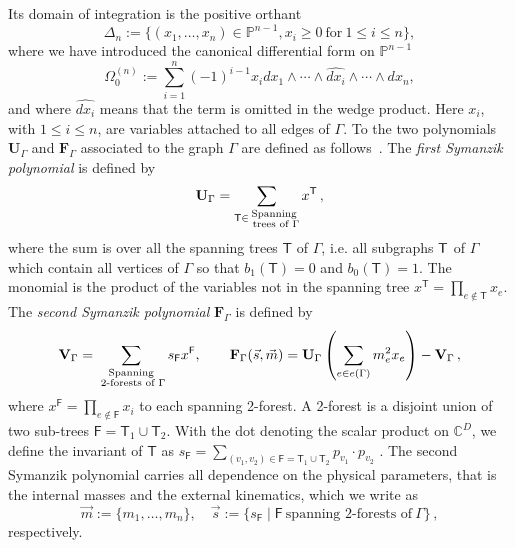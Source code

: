 \documentclass[a4paper,12pt]{article}
\newcommand\lNote[1]{
	\todo[backgroundcolor=red!20!white,fancyline,
	bordercolor=white]{ LDLC:  #1}}
\numberwithin{equation}{section}
\numberwithin{figure}{section}
\begin{document}
Its domain of integration is the positive orthant\lNote{new paragraph?}
\begin{equation}\label{e:Deltan}
	\Delta_n:=\{(x_1,\dots,x_n)\in \mathbb P^{n-1}, x_i \geq0 ~\textrm{for}~ 1\leq
	i\leq n\},
\end{equation}
where we have introduced the  canonical differential form on
$\mathbb P^{n-1}$ 
% 
\begin{equation}
	\Omega_0^{(n)}:=  \sum_{i=1}^n (-1)^{i-1} x_i dx_1\wedge \cdots \wedge \widehat{dx_i} \wedge\cdots \wedge dx_n ,
\end{equation}
and where  $\widehat{dx_i}$ means that the term is omitted in the wedge
product.
Here  $x_i$, with $1\leq i\leq n$,  are  variables attached to all edges of
$\Gamma$.
%
To the two polynomials $\textbf{U}_\Gamma$ and $\textbf{F}_\Gamma$
associated to the graph $\Gamma$ are defined as
follows~\cite{nakanishi1971graph,Bogner:2010kv,Weinzierl:2022eaz}.  The {\em first
Symanzik polynomial} is defined by
\begin{equation}\label{e:Udef}
{\bf U}_\Gamma = \sum_{\mathsf{T} \in \substack{ \text{Spanning} \\ \text{ trees of } \Gamma}} x^{\mathsf{T}}\,, 
\end{equation}
where the sum is over all the spanning trees $\mathsf{T}$ of $\Gamma$,  i.e.  all subgraphs ${\sf T}$ of $\Gamma$ which contain all
vertices of $\Gamma$ so that $b_1(\mathsf{T}) =0$ and
$b_0(\mathsf{T})=1$. The
monomial is the product of the variables not in the spanning tree
$x^{\mathsf{T}} = \prod_{e\notin {\mathsf{T}}} x_e$. 
The {\em second 
Symanzik polynomial}  $\textbf{F}_\Gamma$ is defined by
\begin{equation}\label{e:VFdef}
{\bf V}_{\Gamma} = \sum_{\substack{ \text{Spanning} \\ \text{ 2-forests
			of } \Gamma}}s_{\mathsf{F}} x^{\mathsf{F}}  ,\qquad {\bf F}_{\Gamma}(\vec{s}, \vec{m}) = {\bf U}_\Gamma\left( \sum_{e \in e(\Gamma)} m_e^2 x_e\right) - {\bf V}_{\Gamma}\,,
\end{equation}
where $x^{\mathsf{F}} =
\prod_{e \notin \mathsf{F}} x_i$ to each spanning 2-forest. A 2-forest
is a disjoint union of two sub-trees $\mathsf{F}=\mathsf{T}_1\cup \mathsf{T}_2$. With the dot denoting the scalar product on $\mathbb C^D$,  we define the invariant of $\mathsf T$ as $s_\mathsf{F} = \sum_{(v_1,v_2) \in \mathsf{F}=\mathsf{T}_1\cup \mathsf{T}_2} p_{v_1}\cdot p_{v_2}$ .
The second Symanzik polynomial carries all dependence on the physical parameters, that is 
the
internal masses and the external kinematics, which we  write as 
\begin{equation}
\vec m:=\{m_1,\dots,m_n\}, \quad  \vec s:=\{s_\textsf{F} \mid \textsf{F} ~ \textrm{spanning
	2-forests of}~\Gamma\}\, ,	
\end{equation}
respectively.
\end{document}
